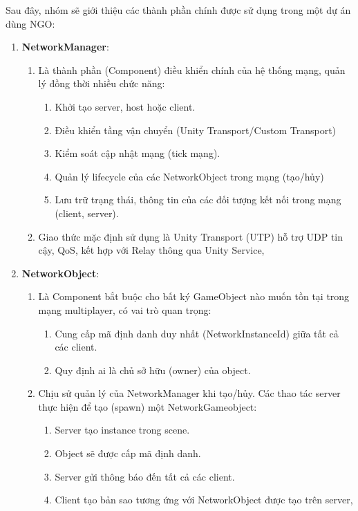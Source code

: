 Sau đây, nhóm sẽ giới thiệu các thành phần chính được sử dụng trong một dự án dùng NGO:
\begin{enumerate}[$\bullet$]
    \item \textbf{NetworkManager}:
    \begin{enumerate}[-]
        \item Là thành phần (Component) điều khiển chính của hệ thống mạng, quản lý đồng thời nhiều chức năng:
        \begin{enumerate}[+]
            \item Khởi tạo server, host hoặc client.
            \item Điều khiển tầng vận chuyển (Unity Transport/Custom Transport)
            \item Kiểm soát cập nhật mạng (tick mạng).
            \item Quản lý lifecycle của các NetworkObject trong mạng (tạo/hủy)
            \item Lưu trữ trạng thái, thông tin của các đối tượng kết nối trong mạng (client, server).
        \end{enumerate}
        \item Giao thức mặc định sử dụng là Unity Transport (UTP) hỗ trợ UDP tin cậy, QoS, kết hợp với Relay thông qua Unity Service, 
    \end{enumerate}   
    \item \textbf{NetworkObject}:
    \begin{enumerate}[-]
        \item Là Component bắt buộc cho bất ký GameObject nào muốn tồn tại trong mạng multiplayer, có vai trò quan trọng:
        \begin{enumerate}[+]
            \item Cung cấp mã định danh duy nhất (NetworkInstanceId) giữa tất cả các client.
            \item Quy định ai là chủ sở hữu (owner) của object.
        \end{enumerate}
        \item Chịu sử quản lý của NetworkManager khi tạo/hủy. Các thao tác server thực hiện để tạo (spawn) một NetworkGameobject:
        \begin{enumerate}[+]
            \item Server tạo instance trong scene.
            \item Object sẽ được cấp mã định danh.
            \item Server gửi thông báo đến tất cả các client.
            \item Client tạo bản sao tương ứng với NetworkObject được tạo trên server,

\end{enumerate}
\end{enumerate}
\end{enumerate}
